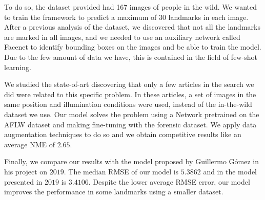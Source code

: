 \medskip

\noindent To do so, the dataset provided had 167 images of people in the wild. We wanted to train the framework to predict a maximum of $30$ landmarks in each image. After a previous analysis of the dataset, we discovered that not all the landmarks are marked in all images, and we needed to use an auxiliary network called Facenet to identify bounding boxes on the images and be able to train the model. Due to the few amount of data we have, this is contained in the field of few-shot learning. 

\medskip

\noindent We studied the state-of-art discovering that only a few articles in the search we did were related to this specific problem. In these articles, a set of images in the same position and illumination conditions were used, instead of the in-the-wild dataset we use. Our model solves the problem using a Network pretrained on the AFLW dataset and making fine-tuning with the forensic dataset. We apply data augmentation techniques to do so and we obtain competitive results like an average NME of $2.65$. 

\medskip

\noindent Finally, we compare our results with the model proposed by Guillermo Gómez in his project on $2019$. The median RMSE of our model is $5.3862$ and in the model presented in $2019$ is $3.4106$. Despite the lower average RMSE error, our model improves the performance in some landmarks using a smaller dataset.

\endinput
